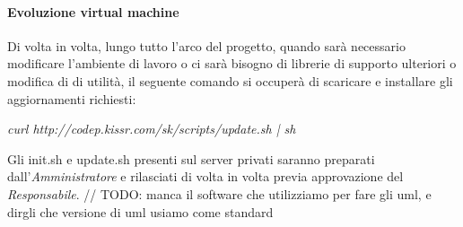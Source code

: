 \documentclass{scalatekids-article}
\begin{document}
\paragraph{Evoluzione virtual machine}
Di volta in volta, lungo tutto l'arco del progetto, quando sarà necessario
modificare l'ambiente di lavoro o ci sarà bisogno di librerie di supporto
ulteriori o modifica di  di utilità, il seguente comando si
occuperà di scaricare e installare gli aggiornamenti richiesti:
\begin{center}
  \textit{curl http://codep.kissr.com/sk/scripts/update.sh | sh}
\end{center}
Gli  init.sh e update.sh presenti sul server privati saranno
preparati dall'\textit{Amministratore} e rilasciati di volta in volta previa
approvazione del \textit{Responsabile}.
// TODO: manca il software che utilizziamo per fare gli uml, e dirgli che versione di uml usiamo come standard
\end{document}
